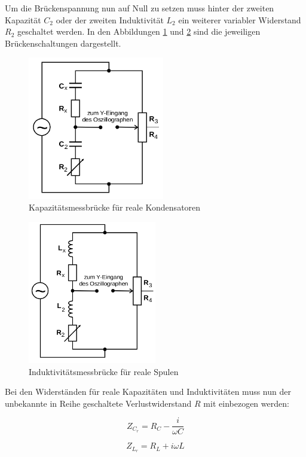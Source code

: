 Um die Brückenspannung nun auf Null zu setzen muss hinter der zweiten
Kapazität $C_2$ oder der zweiten Induktivität $L_2$ ein weiterer
variabler Widerstand $R_2$ geschaltet werden. In den Abbildungen
\ref{fig:KapBr} und \ref{fig:IndBr} sind die jeweiligen Brückenschaltungen
dargestellt.

\newpage

\begin{figure}[h]
  \centering
  \includegraphics[height=6.25cm]{KapBr.png}
  \caption{Kapazitätsmessbrücke für reale Kondensatoren}
  \label{fig:KapBr}
\end{figure}

\begin{figure}[h]
  \centering
  \includegraphics[height=6.25cm]{IndBr.png}
  \caption{Induktivitätsmessbrücke für reale Spulen}
  \label{fig:IndBr}
\end{figure}

Bei den Widerständen für reale Kapazitäten und Induktivitäten muss nun
der unbekannte in Reihe geschaltete Verlustwiderstand $R$ mit einbezogen
werden:

\begin{equation}
  Z_{C_r} = R_C -\frac{i}{\omega C}
\end{equation}

\begin{equation}
  Z_{L_r} = R_L + i \omega L
\end{equation}

